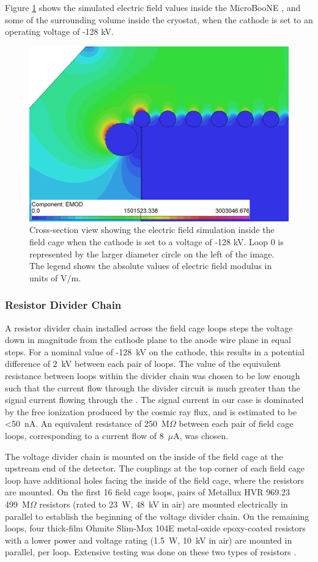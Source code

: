 Figure \ref{fig:efield} shows the simulated electric field values inside the MicroBooNE \lartpc, and some of the surrounding volume inside the cryostat, when the cathode is set to an operating voltage of -128 kV.  

\begin{figure}
\centering	
\includegraphics[width=0.7\linewidth]{figures/efield.png}
\caption{Cross-section view showing the electric field simulation inside the field cage when the cathode is set to a voltage of -128 kV.  Loop 0 is represented by the larger diameter circle on the left of the image.  The legend shows the absolute values of electric field modulus in units of V/m.}
\label{fig:efield}
\end{figure}



\subsubsection{Resistor Divider Chain}

A resistor divider chain installed across the field cage loops steps the voltage down in magnitude from the cathode plane to the anode wire plane in equal steps.  For a nominal value of -128~kV on the cathode, this results in a potential difference of 2~kV between each pair of loops. The value of the equivalent resistance between loops within the divider chain was chosen to be low enough such that the current flow through the divider circuit is much greater than the signal current flowing through the \lartpc. The signal current in our case is dominated by the free ionization produced by the cosmic ray flux, and is estimated to be <50~nA.  An equivalent resistance of 250~M$\Omega$ between each pair of field cage loops, corresponding to a current flow of 8~$\mu$A, was chosen.  

The voltage divider chain is mounted on the inside of the field cage at the upstream end of the detector. The couplings at the top corner of each field cage loop have additional holes facing the inside of the field cage, where the resistors are mounted. On the first 16 field cage loops, pairs of Metallux HVR 969.23 499~M$\Omega$ resistors (rated to 23~W, 48~kV in air) are mounted electrically in parallel to establish the beginning of the voltage divider chain. On the remaining loops, four thick-film Ohmite Slim-Mox 104E metal-oxide epoxy-coated resistors with a lower power and voltage rating (1.5~W, 10~kV in air) are mounted in parallel, per loop.  Extensive testing was done on these two types of resistors \cite{Bagby:2014wva}. 

